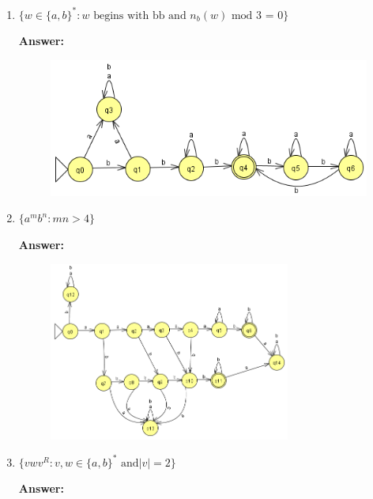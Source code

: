 \documentclass[12pt]{article}
\begin{document}
\begin{spacing}{1.5}
\begin{enumerate}
\begin{enumerate}
			      \item $\{w \in \{a,b \}^* : \text{$w$ begins with bb and $n_b(w)$ mod 3 = 0} \}$

			            \noindent \textbf{Answer:}

			            \begin{figure}[h!]
				            \centering
				            \includegraphics[width=0.75	\textwidth]{img/q3/q3_d.png}
			            \end{figure}

			            \newpage

			      \item $\{a^mb^n : mn > 4\}$

			            \noindent \textbf{Answer:}

			            \begin{figure}[h!]
				            \centering
				            \includegraphics[width=0.75\textwidth]{img/q3/q3_e.png}
			            \end{figure}

			      \item $\{vwv^R : v,w \in \{a,b \}^* \text{ and} |v| = 2 \}$

			            \noindent \textbf{Answer:}


\end{enumerate}
\end{enumerate}
\end{spacing}
\end{document}
